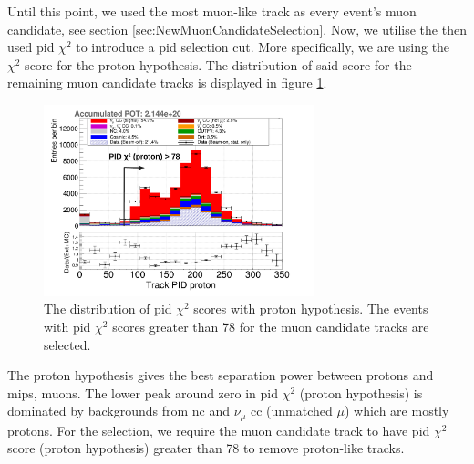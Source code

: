 Until this point, we used the most muon-like track as every event's muon candidate, see section \ref{sec:NewMuonCandidateSelection}. Now, we utilise the then used \gls{pid} $\chi^2$ to introduce a \gls{pid} selection cut. More specifically, we are using the $\chi^2$ score for the proton hypothesis. The distribution of said score for the remaining muon candidate tracks is displayed in figure \ref{fig:PID_proton_78_7}.
\begin{figure}[htbp]
  \centering
  \includegraphics[width=0.7\textwidth]{images/NewCCInclusive/selection/PID_proton_78_7.pdf}
  \caption[Muon Candidate PID Chi-Square Cut]{The distribution of \gls{pid} $\chi^2$ scores with proton hypothesis. The events with \gls{pid} $\chi^2$ scores greater than \num{78} for the muon candidate tracks are selected.}
  \label{fig:PID_proton_78_7}
\end{figure}
The proton hypothesis gives the best separation power between protons and \glspl{mip}, \eg muons. The lower peak around zero in \gls{pid} $\chi^2$ (proton hypothesis) is dominated by backgrounds from \gls{nc} and $\nu_\mu$ \gls{cc} (unmatched $\mu$) which are mostly protons. For the selection, we require the muon candidate track to have \gls{pid} $\chi^2$ score (proton hypothesis) greater than \num{78} to remove proton-like tracks.

